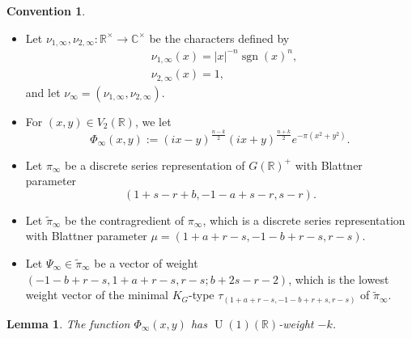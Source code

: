 \documentclass[11pt, a4paper]{amsart}
\theoremstyle{plain}
\newtheorem{lemma}[theorem]{Lemma}
\theoremstyle{definition}
\newtheorem{convention}[theorem]{Convention}
\numberwithin{equation}{section}
\def\CC{\mathbb{C}}
\def\RR{\mathbb{R}}
\DeclareMathOperator{\sgn}{sgn}
\DeclareMathOperator{\U}{\mathrm{U}}
\begin{document}
\begin{convention}
    \begin{itemize}
        \item  Let $\nu_{1, \infty}, \nu_{2, \infty} \colon \RR^{\times} \rightarrow \CC^{\times}$ be the characters defined by 
        \begin{align*}
            & \nu_{1, \infty}(x) = |x|^{-n} \sgn(x)^{n}, \\
            & \nu_{2, \infty}(x) = 1,
        \end{align*}
        and let $\nu_{\infty} = (\nu_{1, \infty}, \nu_{2, \infty})$. 
        \item For $(x, y) \in V_{2}(\RR)$, we let  
              \begin{equation}
                  \Phi_{\infty}(x, y) := (ix - y)^{\frac{n - k}{2}}(ix + y)^{\frac{n + k}{2}} e^{-\pi(x^2 + y^2)}. 
              \end{equation}
        \item Let $\pi_{\infty}$ be a discrete series representation of $G(\RR)^{+}$ with Blattner parameter 
            \begin{equation*}
                (1+s-r+b, -1-a+s-r, s-r). 
            \end{equation*}
        \item Let $\tilde{\pi}_{\infty}$ be the contragredient of $\pi_{\infty}$, which is a discrete series representation with Blattner parameter $\mu = (1 + a + r -s, -1 -b + r - s, r - s)$. 
        \item Let $\Psi_{\infty} \in \tilde{\pi}_{\infty}$ be a vector of weight $(-1 -b + r - s, 1 + a + r - s, r - s; b + 2s -r -2)$, which is the lowest weight vector of the minimal $K_{G}$-type $\tau_{(1 + a + r -s, -1 - b + r  + s, r - s)}$ of $\tilde{\pi}_{\infty}$. 
    \end{itemize}
\end{convention}


\begin{lemma}
\label{Lemma: arch_weight of Phi}
    The function $\Phi_{\infty}(x, y)$ has $\U(1)(\RR)$-weight $-k$. 
\end{lemma}
\end{document}
